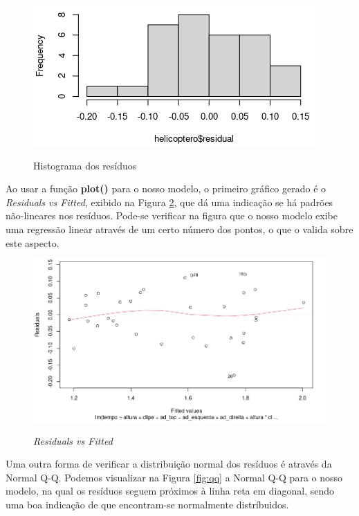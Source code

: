\begin{figure}[H]
  \caption{Histograma dos resíduos}
  \center
  \includegraphics[scale=0.7]{images/hist_residuals.png}
  \label{fig:hist_residuals}
\end{figure}

Ao usar a função \textbf{plot()} para o nosso modelo, o primeiro gráfico gerado é o \textit{Residuals vs Fitted}, exibido na Figura \ref{fig:fitted}, que dá uma indicação se há padrões não-lineares nos resíduos. Pode-se verificar na figura que o nosso modelo exibe uma regressão linear através de um certo número dos pontos, o que o valida sobre este aspecto. 

\begin{figure}[H]
\caption{\textit{Residuals vs Fitted}}
\center 
\includegraphics[scale=0.48]{images/fitted.png}
\label{fig:fitted}
\end{figure}

Uma outra forma de verificar a distribuição normal dos resíduos é através da Normal Q-Q. Podemos visualizar na Figura \ref{fig:qq} a Normal Q-Q para o nosso modelo, na qual os resíduos seguem próximos à linha reta em diagonal, sendo uma boa indicação de que encontram-se normalmente distríbuidos.

